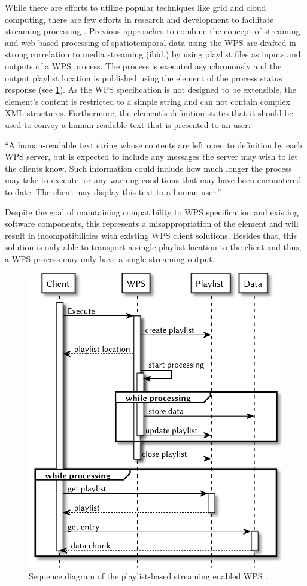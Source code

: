 While there are efforts to utilize popular techniques like grid and cloud computing, there are few efforts in research and development to facilitate streaming processing \citep{foerster2012live}. Previous approaches to combine the concept of streaming and web-based processing of spatiotemporal data using the \ac{WPS} are drafted in strong correlation to media streaming (ibid.) by using playlist files \citep{ietf:draft-pantos-http-live-streaming-12} as inputs and outputs of a \ac{WPS} process. The process is executed asynchronously and the output playlist location is published using the  element of the process status response (see \cref{fig:sd:previous}). As the \ac{WPS} specification is not designed to be extensible, the element's content is restricted to a simple string and can not contain complex \ac{XML} structures. Furthermore, the element's definition states that it should be used to convey a human readable text that is presented to an user:
\begin{xquote}
  ``A human-readable text string whose contents are left open to definition by each WPS server, but is expected to include any messages the server may wish to let the clients know. Such information could include how much longer the process may take to execute, or any warning conditions that may have been encountered to date. The client may display this text to a human user.''
\end{xquote}
Despite the goal of maintaining compatibility to \ac{WPS} specification and existing software components, this represents a misappropriation of the element and will result in incompatibilities with existing \ac{WPS} client solutions. Besides that, this solution is only able to transport a single playlist location to the client and thus, a \ac{WPS} process may only have a single streaming output.

\begin{figure}[!htb]
  \centering
  \includegraphics[width = 0.54225352112676062\linewidth]{figures/sequence-diagram-previous.pdf}
  \caption{\label{fig:sd:previous}Sequence diagram of the playlist-based streaming enabled WPS \citep{foerster2012live}.}
\end{figure}

